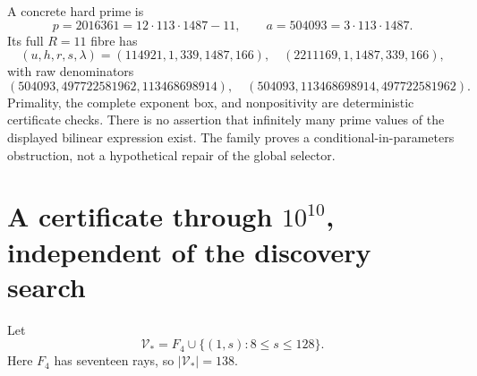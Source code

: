 \documentclass[11pt]{article}
\theoremstyle{definition}\newtheorem{definition}[theorem]{Definition}
\theoremstyle{remark}\newtheorem{remark}[theorem]{Remark}
\newcommand{\V}{\mathcal V}
\begin{document}
A concrete hard prime is
\[
 p=2016361=12\cdot113\cdot1487-11,
 \qquad a=504093=3\cdot113\cdot1487.
\]
Its full $R=11$ fibre has
\[
 (u,h,r,s,\lambda)=(114921,1,339,1487,166),
 \quad(2211169,1,1487,339,166),
\]
with raw denominators
\[
 (504093,497722581962,113468698914),
 \quad(504093,113468698914,497722581962).
\]
Primality, the complete exponent box, and nonpositivity are deterministic certificate checks. There is no assertion that infinitely many prime values of the displayed bilinear expression exist. The family proves a conditional-in-parameters obstruction, not a hypothetical repair of the global selector.

\section{A certificate through $10^{10}$, independent of the discovery search}\label{sec:cover}
Let
\[
 \V_* = F_4\cup\{(1,s):8\le s\le128\}.
\]
Here $F_4$ has seventeen rays, so $|\V_*|=138$.
\end{document}
